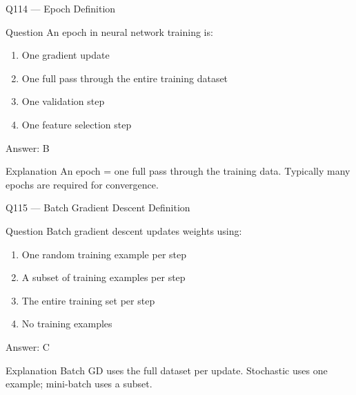 \documentclass[aspectratio=169,8pt]{beamer}
\begin{document}
	\begin{frame}{Q114 --- Epoch Definition}
		\begin{block}{Question}
			An epoch in neural network training is:
			\begin{enumerate}
				\item One gradient update
				\item One full pass through the entire training dataset
				\item One validation step
				\item One feature selection step
			\end{enumerate}
		\end{block}
		\begin{exampleblock}{Answer: B}\end{exampleblock}
		\begin{block}{Explanation}
			An epoch = one full pass through the training data. Typically many epochs are required for convergence.
		\end{block}
	\end{frame}
	
	\begin{frame}{Q115 --- Batch Gradient Descent Definition}
		\begin{block}{Question}
			Batch gradient descent updates weights using:
			\begin{enumerate}
				\item One random training example per step
				\item A subset of training examples per step
				\item The entire training set per step
				\item No training examples
			\end{enumerate}
		\end{block}
		\begin{exampleblock}{Answer: C}\end{exampleblock}
		\begin{block}{Explanation}
			Batch GD uses the full dataset per update. Stochastic uses one example; mini-batch uses a subset.
		\end{block}
	\end{frame}
	
\end{document}
